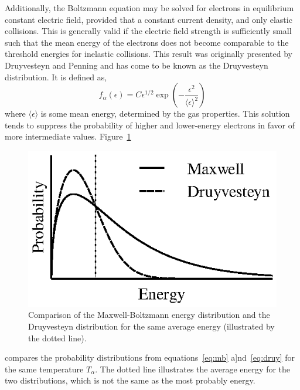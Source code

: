Additionally, the Boltzmann equation may be solved for electrons in equilibrium
constant electric field, provided that a constant current density, and only
elastic collisions. This is generally valid if the electric field strength is
sufficiently small such that the mean energy of the electrons does not become
comparable to the threshold energies for inelastic collisions. This result was
originally presented by Druyvesteyn and Penning \cite{Druyvesteyn1940} and has
come to be known as the Druyvesteyn distribution. It is defined as,
\begin{equation}
  f_\alpha(\epsilon) = C \epsilon^{1/2}
           \exp\left(-\frac{\epsilon^2}{\langle \epsilon \rangle^2} \right)
  \label{eq:druy}
\end{equation}
where $\langle\epsilon\rangle$ is some mean energy, determined by the gas
properties. This solution tends to suppress the probability of higher and
lower-energy electrons in favor of more intermediate values.
Figure~\ref{fig:simpledists}
\begin{figure}
  \centering
  \includegraphics{./chapters/theory/figures/simpledists.eps}
  \caption{Comparison of the Maxwell-Boltzmann energy distribution and the
    Druyvesteyn distribution for the same average energy (illustrated by the
  dotted line).}
  \label{fig:simpledists}
\end{figure}
compares the probability distributions from equations~\ref{eq:mb}
a]nd~\ref{eq:druy} for the same temperature $T_\alpha$. The dotted line
illustrates the average energy for the two distributions, which is not the same
as the most probably energy.

